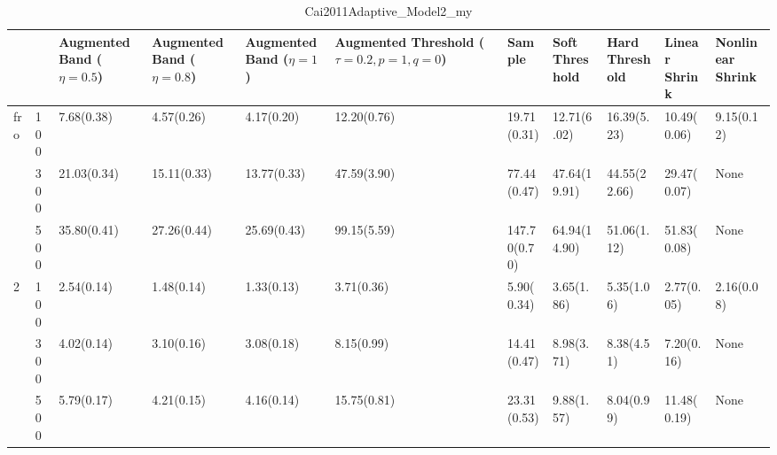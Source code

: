 \begin{table}[htbp]
\centering
\caption{Cai2011Adaptive_Model2_my}
\label{my label}
\begin{tabular}{ll|p{2cm}p{2cm}p{2cm}p{2cm}p{2cm}p{2cm}p{2cm}p{2cm}p{2cm}}
\toprule
  &     & Augmented Band ($\eta=0.5$) & Augmented Band ($\eta=0.8$) & Augmented Band ($\eta=1$) & Augmented Threshold ($\tau=0.2, p=1, q=0$) &        Sample & Soft Threshold & Hard Threshold & Linear Shrink & Nonlinear Shrink \\
\midrule
fro & 100 &                  7.68(0.38) &                  4.57(0.26) &                4.17(0.20) &                                12.20(0.76) &   19.71(0.31) &    12.71(6.02) &    16.39(5.23) &   10.49(0.06) &       9.15(0.12) \\
  & 300 &                 21.03(0.34) &                 15.11(0.33) &               13.77(0.33) &                                47.59(3.90) &   77.44(0.47) &   47.64(19.91) &   44.55(22.66) &   29.47(0.07) &             None \\
  & 500 &                 35.80(0.41) &                 27.26(0.44) &               25.69(0.43) &                                99.15(5.59) &  147.70(0.70) &   64.94(14.90) &    51.06(1.12) &   51.83(0.08) &             None \\
2 & 100 &                  2.54(0.14) &                  1.48(0.14) &                1.33(0.13) &                                 3.71(0.36) &    5.90(0.34) &     3.65(1.86) &     5.35(1.06) &    2.77(0.05) &       2.16(0.08) \\
  & 300 &                  4.02(0.14) &                  3.10(0.16) &                3.08(0.18) &                                 8.15(0.99) &   14.41(0.47) &     8.98(3.71) &     8.38(4.51) &    7.20(0.16) &             None \\
  & 500 &                  5.79(0.17) &                  4.21(0.15) &                4.16(0.14) &                                15.75(0.81) &   23.31(0.53) &     9.88(1.57) &     8.04(0.99) &   11.48(0.19) &             None \\
\bottomrule
\end{tabular}
\end{table}
